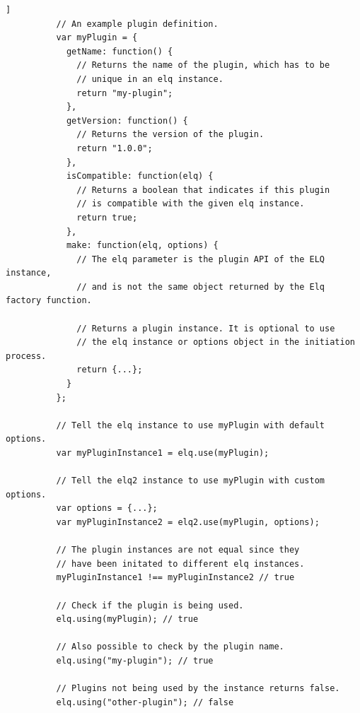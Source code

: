 \documentclass[a4paper,11pt]{kth-mag}
\begin{document}
        \begin{lstlisting}[gobble=10,caption={Example plugin definition and examples of handling plugins.},captionpos=b,label={code:plugin-object}]]
          // An example plugin definition.
          var myPlugin = {
            getName: function() {
              // Returns the name of the plugin, which has to be 
              // unique in an elq instance.
              return "my-plugin";
            },
            getVersion: function() {
              // Returns the version of the plugin.
              return "1.0.0";
            },
            isCompatible: function(elq) {
              // Returns a boolean that indicates if this plugin
              // is compatible with the given elq instance.
              return true;
            },
            make: function(elq, options) {
              // The elq parameter is the plugin API of the ELQ instance,
              // and is not the same object returned by the Elq factory function.

              // Returns a plugin instance. It is optional to use
              // the elq instance or options object in the initiation process.
              return {...};
            }
          };

          // Tell the elq instance to use myPlugin with default options.
          var myPluginInstance1 = elq.use(myPlugin);

          // Tell the elq2 instance to use myPlugin with custom options.
          var options = {...};
          var myPluginInstance2 = elq2.use(myPlugin, options);

          // The plugin instances are not equal since they 
          // have been initated to different elq instances.
          myPluginInstance1 !== myPluginInstance2 // true

          // Check if the plugin is being used.
          elq.using(myPlugin); // true

          // Also possible to check by the plugin name.
          elq.using("my-plugin"); // true

          // Plugins not being used by the instance returns false.
          elq.using("other-plugin"); // false
        \end{lstlisting}
\end{document}
